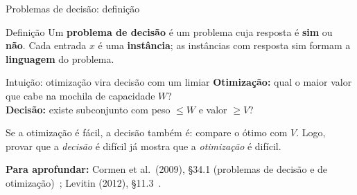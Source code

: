 \documentclass[aspectratio=169,xcolor=table]{beamer}
\newcommand{\fonte}[1]{%
  \vfill
  {\tiny\color{gray!55!black}\textbf{Para aprofundar:} #1\par}%
}
\begin{document}
\begin{frame}{Problemas de decisão: definição}
  \begin{block}{Definição}
    \small
    Um \textbf{problema de decisão} é um problema cuja resposta é \textbf{sim} ou
    \textbf{não}. Cada entrada $x$ é uma \textbf{instância}; as instâncias com resposta sim
    formam a \textbf{linguagem} do problema.
  \end{block}
  \begin{exampleblock}{Intuição: otimização vira decisão com um limiar}
    \small
    \textbf{Otimização:} qual o maior valor que cabe na mochila de capacidade $W$?\\
    \textbf{Decisão:} existe subconjunto com peso $\le W$ e valor $\ge V$?\\[2pt]
    {\scriptsize Se a otimização é fácil, a decisão também é: compare o ótimo com $V$. Logo,
    provar que a \emph{decisão} é difícil já mostra que a \emph{otimização} é difícil.\par}
  \end{exampleblock}
  \fonte{Cormen et al.\ (2009), \S 34.1 (problemas de decisão e de otimização)~\cite{cormen2009introduction};
    Levitin (2012), \S 11.3~\cite{levitin2012introduction}.}
\end{frame}
\end{document}
